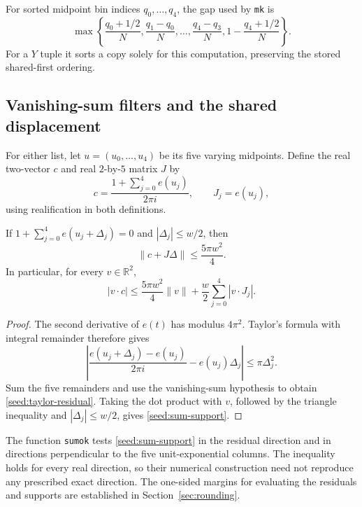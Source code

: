 For sorted midpoint bin indices $q_0,\ldots,q_4$, the gap used by
\texttt{mk} is
\[
 \max\left\{\frac{q_0+1/2}{N},
 \frac{q_1-q_0}{N},\ldots,\frac{q_4-q_3}{N},
 1-\frac{q_4+1/2}{N}\right\}.
\]
For a $Y$ tuple it sorts a copy solely for this computation, preserving
the stored shared-first ordering.

\subsection{Vanishing-sum filters and the shared displacement}

For either list, let $u=(u_0,\ldots,u_4)$ be its five varying midpoints.
Define the real two-vector $c$ and real $2$-by-$5$ matrix $J$ by
\begin{equation}
\label{seed:residual-data}
 c=\frac{1+\sum_{j=0}^4e(u_j)}{2\pi i},\qquad J_j=e(u_j),
\end{equation}
using realification in both definitions.

\begin{lemma}
\label{seed:sum-test}
If $1+\sum_{j=0}^4e(u_j+\Delta_j)=0$ and $|\Delta_j|\le w/2$, then
\begin{equation}
\label{seed:taylor-residual}
 \|c+J\Delta\|\le\frac{5\pi w^2}{4}.
\end{equation}
In particular, for every $v\in\mathbb R^2$,
\begin{equation}
\label{seed:sum-support}
 |v\cdot c|\le\frac{5\pi w^2}{4}\|v\|
                  +\frac w2\sum_{j=0}^4|v\cdot J_j|.
\end{equation}
\end{lemma}

\begin{proof}
The second derivative of $e(t)$ has modulus $4\pi^2$.  Taylor's formula
with integral remainder therefore gives
\[
 \left|\frac{e(u_j+\Delta_j)-e(u_j)}{2\pi i}
             -e(u_j)\Delta_j\right|\le\pi\Delta_j^2.
\]
Sum the five remainders and use the vanishing-sum hypothesis to obtain
\eqref{seed:taylor-residual}.  Taking the dot product with $v$, followed
by the triangle inequality and $|\Delta_j|\le w/2$, gives
\eqref{seed:sum-support}.
\end{proof}

The function \texttt{sumok} tests \eqref{seed:sum-support} in the residual
direction and in directions perpendicular to the five unit-exponential
columns.  The inequality holds for every real direction, so their numerical
construction need not reproduce any prescribed exact direction.  The
one-sided margins for evaluating the residuals and supports are established
in Section~\ref{sec:rounding}.

